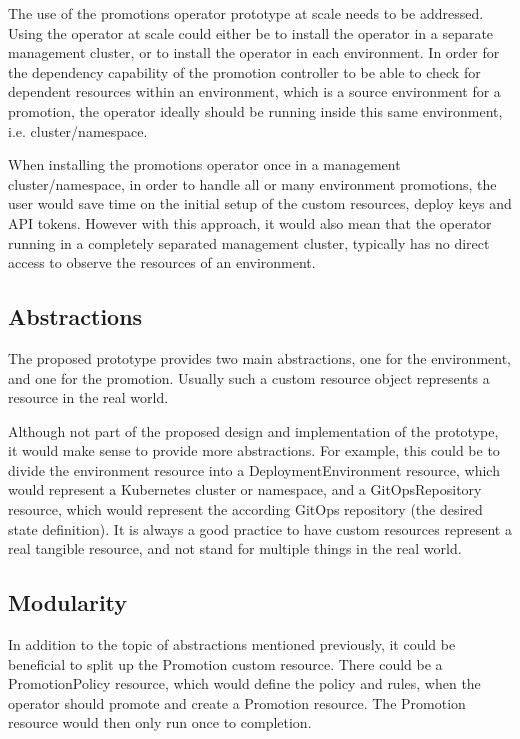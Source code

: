 The use of the promotions operator prototype at scale needs to be addressed.
Using the operator at scale could either be to install the operator in a separate management cluster,
or to install the operator in each environment.
In order for the dependency capability of the promotion controller
to be able to check for dependent resources within an environment,
which is a source environment for a promotion,
the operator ideally should be running inside this same environment, i.e. cluster/namespace.

When installing the promotions operator once in a management cluster/namespace,
in order to handle all or many environment promotions,
the user would save time on the initial setup of the custom resources, deploy keys and API tokens.
However with this approach, it would also mean that the operator running in a completely separated management cluster, typically has no direct access to observe the resources of an environment.

\subsection*{Abstractions}

The proposed prototype provides two main abstractions,
one for the environment,
and one for the promotion.
Usually such a custom resource object represents a resource in the real world.

Although not part of the proposed design and implementation of the prototype,
it would make sense to provide more abstractions.
For example, this could be to divide the environment resource into
a DeploymentEnvironment resource, which would represent a Kubernetes cluster or namespace,
and a GitOpsRepository resource, which would represent the according GitOps repository (the desired state definition).
It is always a good practice to have custom resources represent a real tangible resource,
and not stand for multiple things in the real world.

\subsection*{Modularity}

In addition to the topic of abstractions mentioned previously,
it could be beneficial to split up the Promotion custom resource.
There could be a PromotionPolicy resource,
which would define the policy and rules,
when the operator should promote and create a Promotion resource.
The Promotion resource would then only run once to completion.














